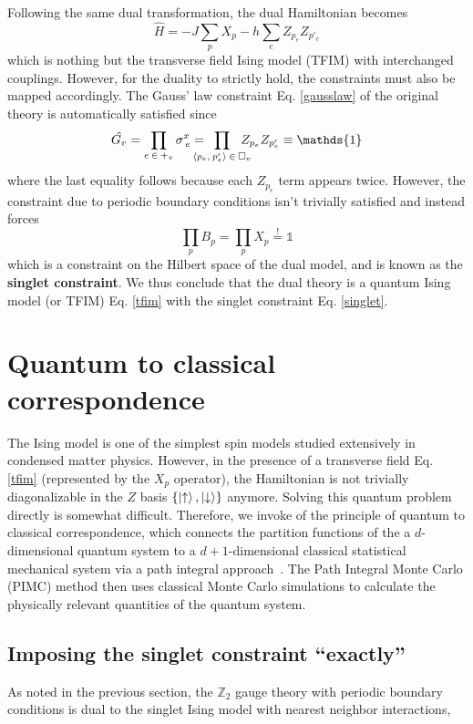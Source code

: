 \documentclass[../thesis_main.tex]{subfiles}
\begin{document}
Following the same dual transformation, the dual Hamiltonian becomes
\begin{equation}
    \hat{H} = -J \sum_p X_p - h \sum_e Z_{p_e} Z_{p'_e}
    \label{tfim}
\end{equation}
which is nothing but the transverse field Ising model (TFIM) with interchanged couplings. However, for the duality to strictly hold, the constraints must also be mapped accordingly. The Gauss' law constraint Eq. \eqref{gausslaw} of the original theory is automatically satisfied since 
\begin{equation}
    \hat{G_v} = \prod_{e \:\in\: +_v} \sigma^x_{\: e} = \!\!\!\!\!\!\! \prod_{\expval{p_e, \: p'_e} \: \in \: \Box_v} \!\!\!\!\!\!  Z_{p_e} Z_{p'_e} \equiv \mathds{1}
\end{equation}
where the last equality follows because each $Z_{p_e}$ term appears twice. However, the constraint due to periodic boundary conditions isn't trivially satisfied and instead forces
\begin{equation}
    \prod_p B_p = \prod_p X_p \stackrel{!}{=} \mathds{1}
    \label{singlet}
\end{equation}
which is a constraint on the Hilbert space of the dual model, and is known as the \textbf{singlet constraint}. We thus conclude that the dual theory is a quantum Ising model (or TFIM) Eq. \eqref{tfim} with the singlet constraint Eq. \eqref{singlet}.
\section{Quantum to classical correspondence}
The Ising model is one of the simplest spin models studied extensively in condensed matter physics. However, in the presence of a transverse field Eq. \eqref{tfim} (represented by the $X_p$ operator), the Hamiltonian is not trivially diagonalizable in the $Z$ basis $\{\ket{\uparrow}, \ket{\downarrow} \}$ anymore. Solving this quantum problem directly is somewhat difficult. Therefore, we invoke of the principle of quantum to classical correspondence, which connects the partition functions of the a $d$-dimensional quantum system to a $d+1$-dimensional classical statistical mechanical system via a path integral approach~\cite{suzuki}. The Path Integral Monte Carlo (PIMC) method then uses classical Monte Carlo simulations to calculate the physically relevant quantities of the quantum system.
\subsection{Imposing the singlet constraint ``exactly''}
As noted in the previous section, the $\mathbb{Z}_2$ gauge theory with periodic boundary conditions is dual to the singlet Ising model with nearest neighbor interactions,
\end{document}
